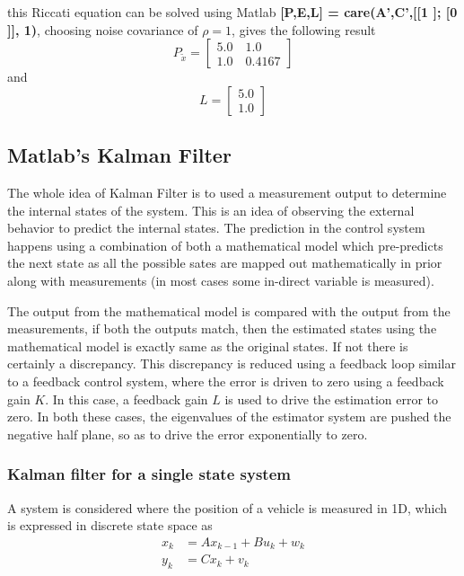 this Riccati equation can be solved using Matlab \textbf{[P,E,L] = care(A',C',[[1 ]; [0 ]], 1)}, choosing noise covariance of $\rho = 1$, gives the following result
$$P_{\tilde{x}} = \begin{bmatrix}
5.0 \quad 1.0 \\ 1.0 \quad 0.4167
\end{bmatrix}$$ and
$$ L = \begin{bmatrix}
5.0 \\ 1.0
\end{bmatrix}$$

\subsection{Matlab's Kalman Filter}

The whole idea of Kalman Filter is to used a measurement output to determine the internal states of the system. This is an idea of observing the external behavior to predict the internal states. The prediction in the control system happens using a combination of both a mathematical model which pre-predicts the next state as all the possible sates are mapped out mathematically in prior along with measurements (in most cases some in-direct variable is measured).

The output from the mathematical model is compared with the output from the measurements, if both the outputs match, then the estimated states using the mathematical model is exactly same as the original states. If not there is certainly a discrepancy. This discrepancy is reduced using a feedback loop similar to a feedback control system, where the error is driven to zero using a feedback gain $K$. In this case, a feedback gain $L$ is used to drive the estimation error to zero. In both these cases, the eigenvalues of the estimator system are pushed the negative half plane, so as to drive the error exponentially to zero. 

\subsubsection{Kalman filter for a single state system}

A system is considered where the position of a vehicle is measured in 1D, which is expressed in discrete state space as
\begin{align}
	x_{k} &= A x_{k-1} + B u_{k} + w_{k} \label{Eq_discrete_ss_1D_sys} \\
	y_{k} &= C x_{k} + v_{k}
\end{align}

